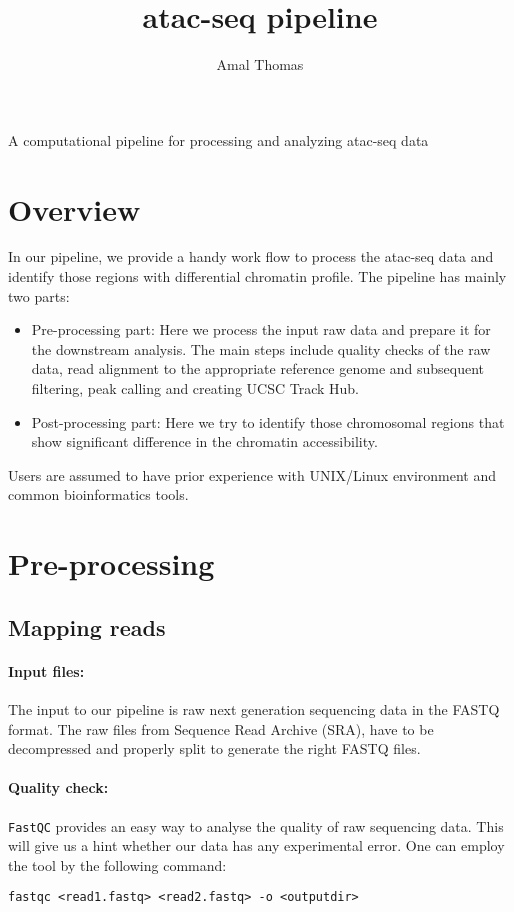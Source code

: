 \documentclass[10pt]{article}
\title{\bf atac-seq pipeline}
\author{Amal Thomas}
\newcommand{\prog}[1]{\texttt{#1}}
\begin{document}
\maketitle

\begin{center}
A computational pipeline for processing and analyzing atac-seq data
\end{center} 

\section{Overview}
In our pipeline, we provide a handy work flow to process the atac-seq data and identify those regions with differential chromatin profile. The pipeline has mainly two parts:
\begin{itemize}
\item Pre-processing part: Here we process the input raw data and prepare it for the downstream analysis. The main steps include quality checks of the raw data, read alignment to the appropriate reference genome and subsequent filtering, peak calling and creating UCSC Track Hub. 
\item Post-processing part: Here we try to identify those chromosomal regions that show significant difference in the chromatin accessibility. 
\end{itemize}
Users are assumed to have prior experience with UNIX/Linux environment and common bioinformatics tools.

\section{Pre-processing}

\subsection{Mapping reads}
\paragraph{Input files:} The input to our pipeline is raw next generation sequencing data in the FASTQ format. The raw files from Sequence Read Archive (SRA), have to be decompressed and properly split to generate the right FASTQ files.
\paragraph{Quality check:} \prog{FastQC} provides an easy way to analyse the quality of raw sequencing data. This will give us a hint whether our data has any experimental error. One can employ the tool by the following command:
\begin{verbatim}
fastqc <read1.fastq> <read2.fastq> -o <outputdir>
\end{verbatim}
\end{document}
